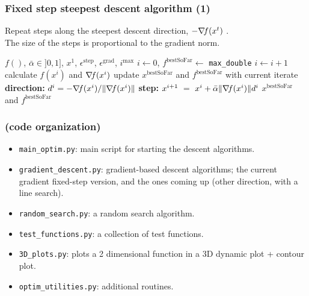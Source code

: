 \documentclass[12pt]{beamer}
\begin{document}
\begin{frame}
\frametitle{Fixed step steepest descent algorithm (1)} 
Repeat steps along the steepest descent direction, $-\nabla\!{f}(x^t)$ \cite{cauchy1847methode,curry1944method}. \\
The size of the steps is proportional to the gradient norm.
\begin{block}{}
\begin{algorithmic}
\REQUIRE $f()$, $\bar\alpha \in ]0,1]$, $x^1$, $\epsilon^{\text{step}}$, $\epsilon^{\text{grad}}$, $i^{\text{max}}$
\STATE $i\leftarrow 0$, $f^{\text{bestSoFar}} \leftarrow $ \texttt{max\_double}
\REPEAT 
\STATE $i \leftarrow i+1$
\STATE calculate $f(x^i)$ and $\nabla\!{f}(x^i)$
\STATE update $x^{\text{bestSoFar}}$ and $f^{\text{bestSoFar}}$ with current iterate
\ENDIF
\STATE \textbf{direction: } $d^i = - \nabla\!{f}(x^i) / \lVert \nabla\!{f}(x^i) \rVert$
\STATE \textbf{step: } $x^{i+1} ~=~ x^i + \bar\alpha \lVert \nabla\!{f}(x^i) \rVert d^i$
\RETURN $x^{\text{bestSoFar}}$ and $f^{\text{bestSoFar}}$
\end{algorithmic}
\end{block}
\end{frame}

\begin{frame}
\frametitle{(code organization)} 
\begin{itemize}
\item \texttt{main\_optim.py}: main script for starting the descent algorithms.
\item \texttt{gradient\_descent.py}: gradient-based descent algorithms; the current gradient fixed-step version, and the ones coming up (other direction, with a line search).
\item \texttt{random\_search.py}: a random search algorithm.
\item \texttt{test\_functions.py}: a collection of test functions.
\item \texttt{3D\_plots.py}: plots a 2 dimensional function in a 3D dynamic plot + contour plot.
\item \texttt{optim\_utilities.py}: additional routines.
\end{itemize}
\end{frame}
\end{document}
